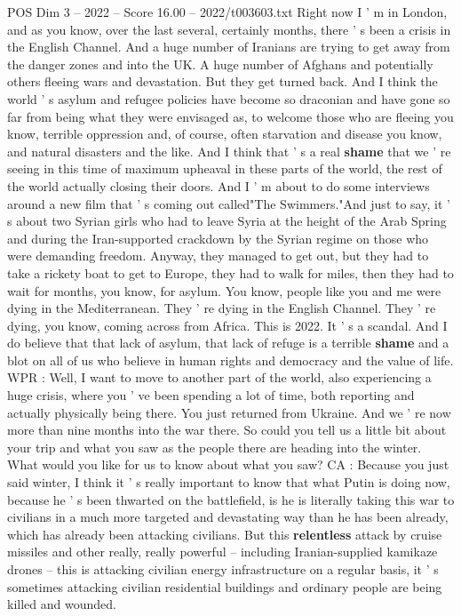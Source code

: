 \begin{textsample}{POS Dim 3 – 2022 – Score 16.00 – 2022/t003603.txt}
Right now I ' m in London, and as you know, over the last several, certainly months, there ' s been a crisis in the English Channel.
And a huge number of Iranians are trying to get away from the danger zones and into the UK.
A huge number of Afghans and potentially others fleeing wars and devastation.
But they get turned back.
And I think the world ' s asylum and refugee policies have become so draconian and have gone so far from being what they were envisaged as, to welcome those who are fleeing you know, terrible oppression and, of course, often starvation and disease you know, and natural disasters and the like.
And I think that ' s a real \textbf{shame} that we ' re seeing in this time of maximum upheaval in these parts of the world, the rest of the world actually closing their doors.
And I ' m about to do some interviews around a new film that ' s coming out called"The Swimmers."And just to say, it ' s about two Syrian girls who had to leave Syria at the height of the Arab Spring and during the Iran-supported crackdown by the Syrian regime on those who were demanding freedom.
Anyway, they managed to get out, but they had to take a rickety boat to get to Europe, they had to walk for miles, then they had to wait for months, you know, for asylum.
You know, people like you and me were dying in the Mediterranean.
They ' re dying in the English Channel.
They ' re dying, you know, coming across from Africa.
This is 2022.
It ' s a scandal.
And I do believe that that lack of asylum, that lack of refuge is a terrible \textbf{shame} and a blot on all of us who believe in human rights and democracy and the value of life.
WPR : Well, I want to move to another part of the world, also experiencing a huge crisis, where you ' ve been spending a lot of time, both reporting and actually physically being there.
You just returned from Ukraine.
And we ' re now more than nine months into the war there.
So could you tell us a little bit about your trip and what you saw as the people there are heading into the winter.
What would you like for us to know about what you saw?
CA : Because you just said winter, I think it ' s really important to know that what Putin is doing now, because he ' s been thwarted on the battlefield, is he is literally taking this war to civilians in a much more targeted and devastating way than he has been already, which has already been attacking civilians.
But this \textbf{relentless} attack by cruise missiles and other really, really powerful -- including Iranian-supplied kamikaze drones -- this is attacking civilian energy infrastructure on a regular basis, it ' s sometimes attacking civilian residential buildings and ordinary people are being killed and wounded.

\end{textsample}
